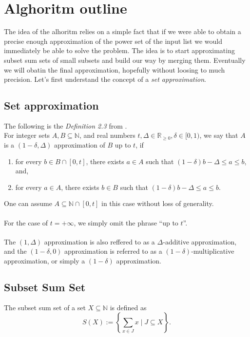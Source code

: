 \section{Alghoritm outline}
The idea of the alhoritm relies on a simple fact that if we were able to obtain a precise enough approximation of the power set of the input list we would immediately be able to solve the \Partition problem. The idea is to start approximating subset sum sets of small subsets and build our way by merging them. Eventually we will obatin the final approximation, hopefully without loosing to much precision. Let's first understand the concept of a \textit{set approximation}.
\subsection{Set approximation}
The following is the \textit{Definition 2.3} from \cite{deng}. \\
For integer sets \(A, B \subseteq \mathbb{N}\), and real numbers \(t, \Delta \in \mathbb{R}_{\geq 0}, \delta \in [0, 1)\), we say that \(A\) is a \((1 - \delta, \Delta)\) approximation of \(B\) up to \(t\), if
\begin{enumerate}
    \item for every \(b \in B \cap [0, t]\), there exists \(a \in A\) such that \((1 - \delta)b - \Delta \leq a \leq b\), and,
    \item for every \(a \in A\), there exists \(b \in B\) such that \((1 - \delta)b - \Delta \leq a \leq b\).
\end{enumerate}
One can assume \(A \subseteq \mathbb{N} \cap [0, t]\) in this case without loss of generality.
\\ \\
For the case of \(t = +\infty\), we simply omit the phrase “up to \(t\)”.
\\ \\
The \((1, \Delta)\) approximation is also reffered to as a \(\Delta\)-additive approximation, and the \((1 - \delta, 0)\) approximation is referred to as a \((1 - \delta)\)-multiplicative approximation, or simply a \((1 - \delta)\) approximation.\\

\subsection{Subset Sum Set}
The subset sum set of a set \(X \subseteq \mathbb{N}\) is defined as
\[
    S(X) := \left\{ \sum_{x \in J} x \mid J \subseteq X \right\}.
\]

